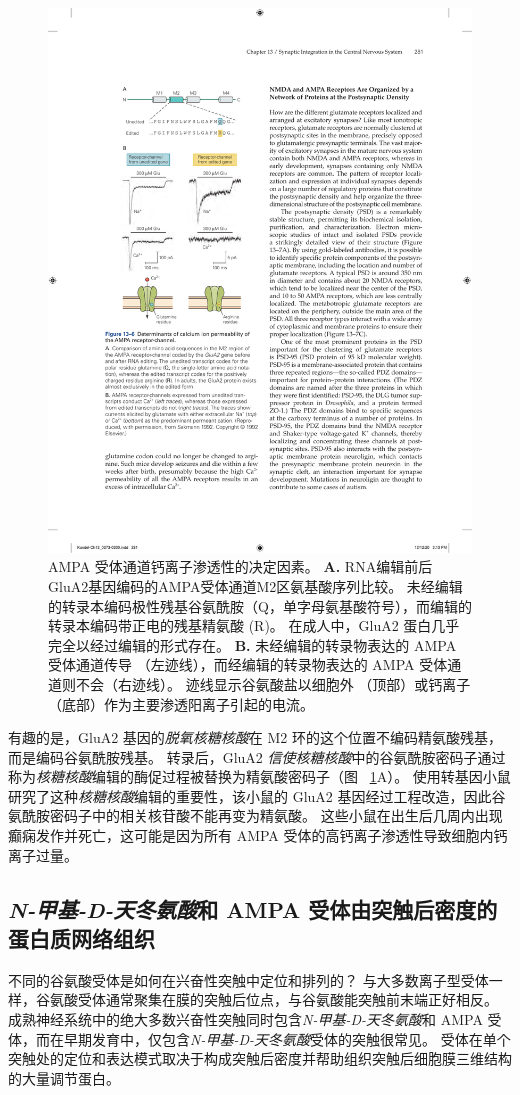 \begin{figure}[htbp]
	\centering
	\includegraphics[width=0.45\linewidth]{chap13/fig_13_6}
	\caption{AMPA 受体通道钙离子渗透性的决定因素。
		\textbf{A.} RNA编辑前后GluA2基因编码的AMPA受体通道M2区氨基酸序列比较。
		未经编辑的转录本编码极性残基谷氨酰胺（Q，单字母氨基酸符号），而编辑的转录本编码带正电的残基精氨酸 (R)。
		在成人中，GluA2 蛋白几乎完全以经过编辑的形式存在。
		\textbf{B.} 未经编辑的转录物表达的 AMPA 受体通道传导 （左迹线），而经编辑的转录物表达的 AMPA 受体通道则不会（右迹线）。
		迹线显示谷氨酸盐以细胞外 （顶部）或钙离子（底部）作为主要渗透阳离子引起的电流\cite{sakmann1992nobel}。}
	\label{fig:13_6}
\end{figure}


有趣的是，GluA2 基因的\textit{脱氧核糖核酸}在 M2 环的这个位置不编码精氨酸残基，而是编码谷氨酰胺残基。
转录后，GluA2 \textit{信使核糖核酸}中的谷氨酰胺密码子通过称为\textit{核糖核酸}编辑的酶促过程被替换为精氨酸密码子（图 ~\ref{fig:13_6}A）。
使用转基因小鼠研究了这种\textit{核糖核酸}编辑的重要性，该小鼠的 GluA2 基因经过工程改造，因此谷氨酰胺密码子中的相关核苷酸不能再变为精氨酸。
这些小鼠在出生后几周内出现癫痫发作并死亡，这可能是因为所有 AMPA 受体的高钙离子渗透性导致细胞内钙离子过量。



\subsection{\textit{N-甲基-D-天冬氨酸}和 AMPA 受体由突触后密度的蛋白质网络组织}

不同的谷氨酸受体是如何在兴奋性突触中定位和排列的？ 
与大多数离子型受体一样，谷氨酸受体通常聚集在膜的突触后位点，与谷氨酸能突触前末端正好相反。
成熟神经系统中的绝大多数兴奋性突触同时包含\textit{N-甲基-D-天冬氨酸}和 AMPA 受体，而在早期发育中，仅包含\textit{N-甲基-D-天冬氨酸}受体的突触很常见。
受体在单个突触处的定位和表达模式取决于构成突触后密度并帮助组织突触后细胞膜三维结构的大量调节蛋白。


